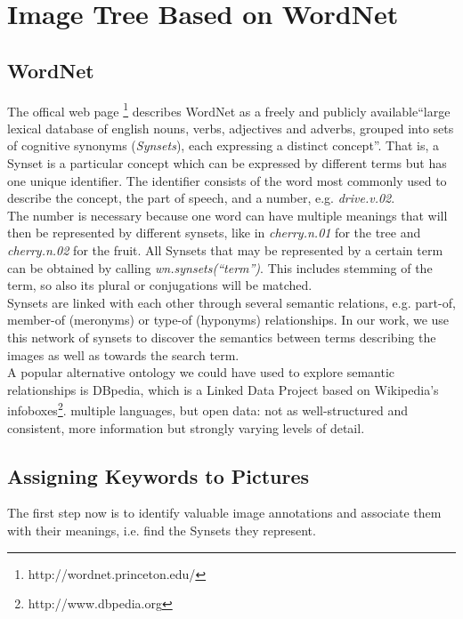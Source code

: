 %
\section{Image Tree Based on WordNet}
\label{sec_wordnetsearchtree}


\subsection{WordNet}
\label{sec_wordnet}
The offical web page \footnote{http://wordnet.princeton.edu/} describes WordNet as a freely and publicly available``large lexical database of english nouns, verbs, adjectives and adverbs, grouped into sets of cognitive synonyms (\emph{Synsets}), each expressing a distinct concept''. That is, a Synset is a particular concept which can be expressed by different terms but has one unique identifier. The identifier consists of the word most commonly used to describe the concept, the part of speech, and a number, e.g. \emph{drive.v.02}.\\
The number is necessary because one word can have multiple meanings that will then be represented by different synsets, like in \emph{cherry.n.01} for the tree and \emph{cherry.n.02} for the fruit. All Synsets that may be represented by a certain term can be obtained by calling \emph{wn.synsets(``term'')}. This includes stemming of the term, so also its plural or conjugations will be matched.\\

Synsets are linked with each other through several semantic relations, e.g. part-of, member-of (meronyms) or type-of (hyponyms) relationships.
In our work, we use this network of synsets to discover the semantics between terms describing the images as well as towards the search term. \\

A popular alternative ontology we could have used to explore semantic relationships is DBpedia, which is a Linked Data Project based on Wikipedia's infoboxes\footnote{http://www.dbpedia.org}. 
multiple languages, but open data: not as well-structured and consistent, more information but strongly varying levels of detail.


\subsection{Assigning Keywords to Pictures}
\label{sec_keywordstopictures}
The first step now is to identify valuable image annotations and associate them with their meanings, i.e. find the Synsets they represent.

